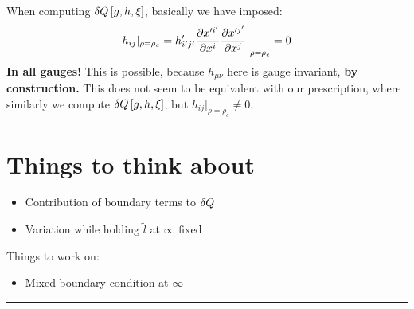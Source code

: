 \documentclass[12pt,a4paper,utf8]{article}
\begin{document}
\begin{itemize}
	When computing $\mathinner{\delta Q}[g,h,\xi]$, basically we have imposed:
	\begin{equation}
		h_{ij}|_{\rho = \rho_c}
		= h'_{i'j'}
			\frac{\partial{x'^{i'}}}{\partial{x^i}}
			\frac{\partial{x'^{j'}}}{\partial{x^j}}
			\bigg|_{\rho = \rho_c}
		= 0
	\end{equation}
	\textbf{In all gauges!} This is possible, because
	$h_{\mu\nu}$ here
	is gauge invariant, \textbf{by construction.}
	This does not seem to be equivalent with our prescription, where similarly we compute $\mathinner{\delta Q}[g,h,\xi]$, but $
		h_{ij}|_{\rho = \rho_c} \ne 0
	$. 
	
	
\end{itemize}

\section{Things to think about}
	\begin{itemize}[nosep]
	\item Contribution of boundary terms to $\mathinner{\delta Q}$
	\item Variation while holding $\tilde{l}$ at $\infty$ fixed
	\end{itemize}





\begin{colored}
Things to work on:
\begin{itemize}[nosep]
	\item Mixed boundary condition at $\infty$
\end{itemize}
\end{colored}


\bigskip\hrule\bigskip
\end{document}
